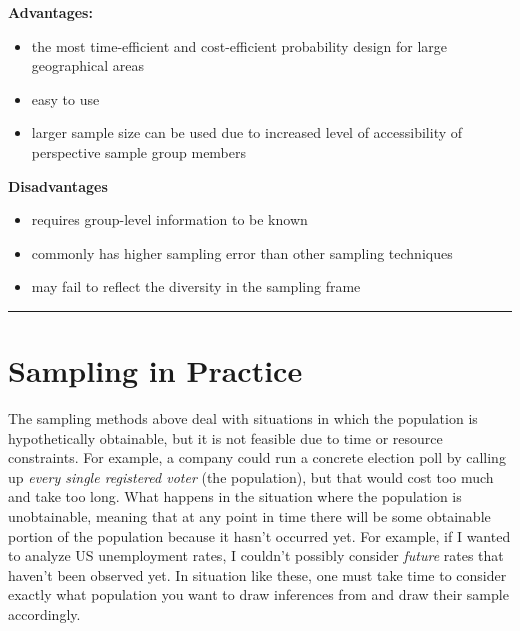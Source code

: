 \documentclass[
]{book}
\begin{document}
\textbf{Advantages:}

\begin{itemize}
\item
  the most time-efficient and cost-efficient probability design for large geographical areas
\item
  easy to use
\item
  larger sample size can be used due to increased level of accessibility of perspective sample group members
\end{itemize}

\textbf{Disadvantages}

\begin{itemize}
\item
  requires group-level information to be known
\item
  commonly has higher sampling error than other sampling techniques
\item
  may fail to reflect the diversity in the sampling frame
\end{itemize}

\begin{center}\rule{0.5\linewidth}{0.5pt}\end{center}

\section{Sampling in Practice}\label{sampling-in-practice}

The sampling methods above deal with situations in which the population is hypothetically obtainable, but it is not feasible due to time or resource constraints. For example, a company could run a concrete election poll by calling up \emph{every single registered voter} (the population), but that would cost too much and take too long. What happens in the situation where the population is unobtainable, meaning that at any point in time there will be some obtainable portion of the population because it hasn't occurred yet. For example, if I wanted to analyze US unemployment rates, I couldn't possibly consider \emph{future} rates that haven't been observed yet. In situation like these, one must take time to consider exactly what population you want to draw inferences from and draw their sample accordingly.
\end{document}
